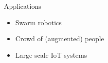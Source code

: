 \begin{frame}{Applications}
  \begin{card}
    \begin{itemize}
      \item Swarm robotics
      \item Crowd of (augmented) people
      \item Large-scale IoT systems
    \end{itemize}
  \end{card}
  \begin{columns}
    \begin{column}{0.3\textwidth}
    \end{column}
    \begin{column}{0.3\textwidth}
    \end{column}
    \begin{column}{0.3\textwidth}
    \end{column}
  \end{columns}
\end{frame}